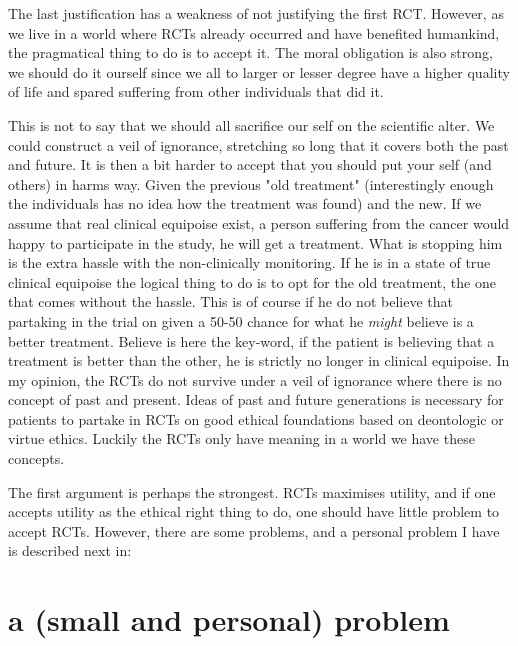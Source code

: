 \documentclass[12p]{article}
\begin{document}
The last justification has a weakness of not justifying the first RCT.
However, as we live in a world where RCTs already occurred and have benefited humankind, the pragmatical thing to do is to accept it.
The moral obligation is also strong, we should do it ourself since we all to larger or lesser degree have a higher quality of life and spared suffering from other individuals that did it.

This is not to say that we should all sacrifice our self on the scientific alter.
We could construct a veil of ignorance, stretching so long that it covers both the past and future.
It is then a bit harder to accept that you should put your self (and others) in harms way.
Given the previous "old treatment" (interestingly enough the individuals has no idea how the treatment was found) and the new.
If we assume that real clinical equipoise exist, a person suffering from the cancer would happy to participate in the study, he will get a treatment.
What is stopping him is the extra hassle with the non-clinically monitoring.
If he is in a state of true clinical equipoise the logical thing to do is to opt for the old treatment, the one that comes without the hassle.
This is of course if he do not believe that partaking in the trial on given a 50-50 chance for what he \emph{might} believe is a better treatment.
Believe is here the key-word, if the patient is believing that a treatment is better than the other, he is strictly no longer in clinical equipoise.
In my opinion, the RCTs do not survive under a veil of ignorance where there is no concept of past and present.
Ideas of past and future generations is necessary for patients to partake in RCTs on good ethical foundations based on deontologic or virtue ethics.
Luckily the RCTs only have meaning in a world we have these concepts.

The first argument is perhaps the strongest.
RCTs maximises utility, and if one accepts utility as the ethical right thing to do, one should have little problem to accept RCTs.
However, there are some problems, and a personal problem I have is described next in:


\section*{a (small and personal) problem}
\end{document}
